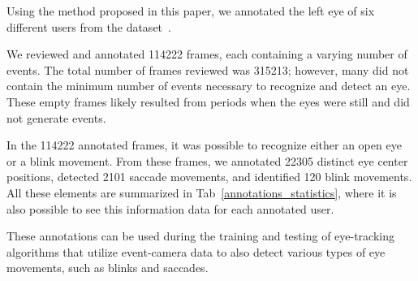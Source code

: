 \label{sec::eval}
Using the method proposed in this paper, we annotated the left eye of six different users from the dataset~\cite{angelopoulos2020event}.

We reviewed and annotated 114222 frames, each containing a varying number of events. The total number of frames reviewed was 315213; however, many did not contain the minimum number of events necessary to recognize and detect an eye. These empty frames likely resulted from periods when the eyes were still and did not generate events.

\begin{table}[t]
\centering
    
\caption{Table reporting core statistics about each annotated user of the Angelopoulos dataset, computed with the proposed method.\label{annotations_statistics}}
\end{table}

In the 114222 annotated frames, it was possible to recognize either an open eye or a blink movement. From these frames, we annotated 22305 distinct eye center positions, detected 2101 saccade movements, and identified 120 blink movements.
All these elements are summarized in Tab~\ref{annotations_statistics}, where it is also possible to see this information data for each annotated user.

These annotations can be used during the training and testing of eye-tracking algorithms that utilize event-camera data to also detect various types of eye movements, such as blinks and saccades.

